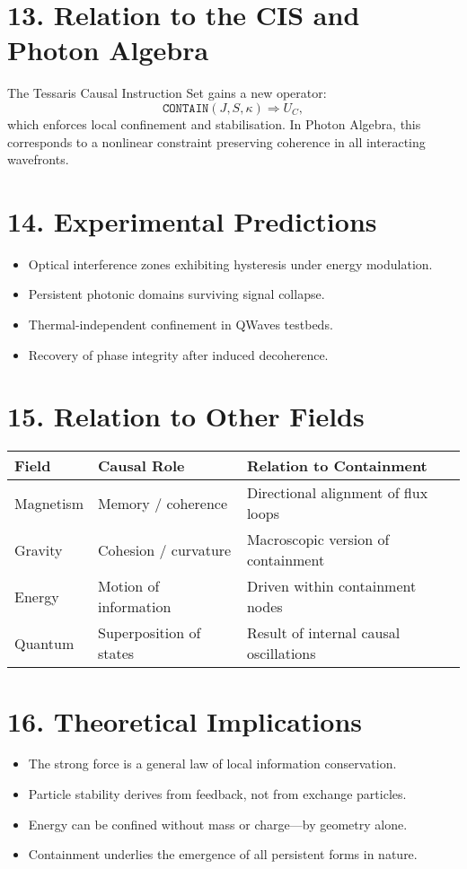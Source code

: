 \documentclass[11pt,a4paper]{article}
\begin{document}
\section{13. Relation to the CIS and Photon Algebra}
The Tessaris Causal Instruction Set gains a new operator:
\[
\texttt{CONTAIN}(J, S, \kappa) \Rightarrow U_C,
\]
which enforces local confinement and stabilisation.  
In Photon Algebra, this corresponds to a nonlinear constraint preserving coherence in all interacting wavefronts.

\section{14. Experimental Predictions}
\begin{itemize}
\item Optical interference zones exhibiting hysteresis under energy modulation.  
\item Persistent photonic domains surviving signal collapse.  
\item Thermal-independent confinement in QWaves testbeds.  
\item Recovery of phase integrity after induced decoherence.  
\end{itemize}

\section{15. Relation to Other Fields}
\begin{longtable}{|l|l|l|}
\hline
\textbf{Field} & \textbf{Causal Role} & \textbf{Relation to Containment} \\
\hline
Magnetism & Memory / coherence & Directional alignment of flux loops \\
Gravity & Cohesion / curvature & Macroscopic version of containment \\
Energy & Motion of information & Driven within containment nodes \\
Quantum & Superposition of states & Result of internal causal oscillations \\
\hline
\end{longtable}

\section{16. Theoretical Implications}
\begin{itemize}
\item The strong force is a general law of local information conservation.  
\item Particle stability derives from feedback, not from exchange particles.  
\item Energy can be confined without mass or charge—by geometry alone.  
\item Containment underlies the emergence of all persistent forms in nature.  
\end{itemize}
\end{document}
